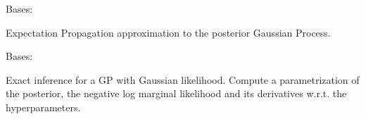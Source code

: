 \documentclass[letterpaper,10pt,english]{sphinxmanual}
\begin{document}
\begin{fulllineitems}
\label{pyGPs.Core:pyGPs.Core.inf.EP}
Bases: {\hyperref[pyGPs.Core:pyGPs.Core.inf.Inference]{}}

Expectation Propagation approximation to the posterior Gaussian Process.

\begin{fulllineitems}
\label{pyGPs.Core:pyGPs.Core.inf.EP.proceed}
\end{fulllineitems}


\end{fulllineitems}


\begin{fulllineitems}
\label{pyGPs.Core:pyGPs.Core.inf.Exact}
Bases: {\hyperref[pyGPs.Core:pyGPs.Core.inf.Inference]{}}

Exact inference for a GP with Gaussian likelihood. Compute a parametrization
of the posterior, the negative log marginal likelihood and its derivatives
w.r.t. the hyperparameters.

\begin{fulllineitems}
\label{pyGPs.Core:pyGPs.Core.inf.Exact.proceed}
\end{fulllineitems}


\end{fulllineitems}

\end{document}
